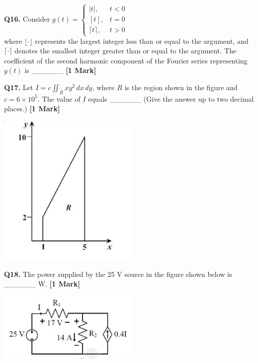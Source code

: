 \documentclass[11pt]{article}
\newcommand{\questiona}[2]{
    \noindent\textbf{Q#2.} #1 \hfill \textbf{[1 Mark]}
}
\begin{document}
\questiona{Consider \( g(t) = 
\begin{cases}
|t|, & t < 0 \\
[t], & t = 0 \\
\lceil t \rceil, & t > 0
\end{cases} \)\\
where \( \lfloor \cdot \rfloor \) represents the largest integer less than or equal to the argument, and \( \lceil \cdot \rceil \) denotes the smallest integer greater than or equal to the argument. The coefficient of the second harmonic component of the Fourier series representing \( g(t) \) is \_\_\_\_\_\_}{16}
\vspace{0.5cm}

\questiona{Let \( I = c \iint_R xy^2 \, dx\,dy \), where \( R \) is the region shown in the figure and \( c = 6 \times 10^5 \). The value of \( I \) equals \_\_\_\_\_\_ (Give the answer up to two decimal places.)}{17}
\begin{center}
\includegraphics[width=0.5\textwidth]{figures/17.png}
\end{center}
\vspace{0.5cm}

\questiona{The power supplied by the 25 V source in the figure shown below is \_\_\_\_\_\_ W.}{18}
\begin{center}
\includegraphics[width=0.5\textwidth]{figures/18.png}
\end{center}
\vspace{0.5cm}
\end{document}
